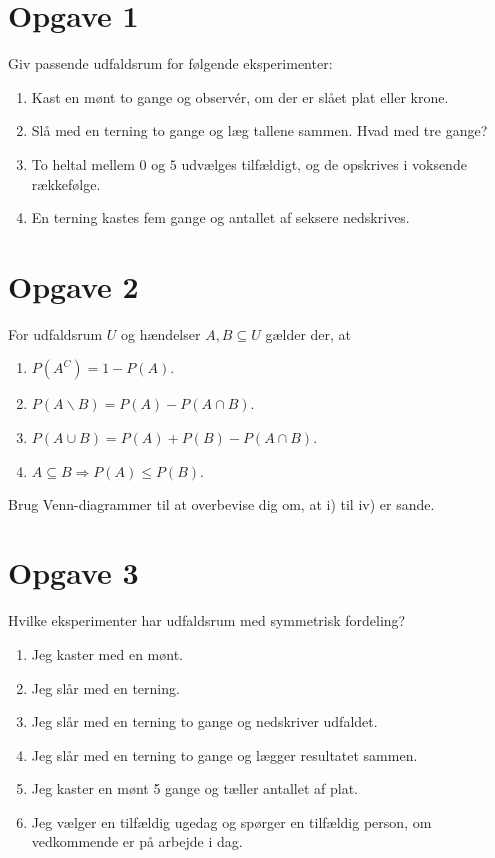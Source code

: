 \section*{Opgave 1}
Giv passende udfaldsrum for følgende eksperimenter:
\begin{enumerate}[label=\roman*)]
\item Kast en mønt to gange og observér, om der er slået plat eller krone. 
\item Slå med en terning to gange og læg tallene sammen. Hvad med tre gange?
\item To heltal mellem $0$ og $5$ udvælges tilfældigt, og de opskrives i voksende rækkefølge.
\item En terning kastes fem gange og antallet af seksere nedskrives.
\end{enumerate}
\section*{Opgave 2}
For udfaldsrum $U$ og hændelser $A,B\subseteq U$ gælder der, at 
\begin{enumerate}[label=\roman*)]
\item $P(A^C) = 1-P(A)$.
\item $P(A \backslash B) = P(A) - P(A\cap B)$.
\item $P(A\cup B) = P(A)+P(B)-P(A\cap B)$.
\item $A\subseteq B \Rightarrow P(A)\leq P(B).$ 
\end{enumerate}
Brug Venn-diagrammer til at overbevise dig om, at i) til iv) er sande.
\section*{Opgave 3}
Hvilke eksperimenter har udfaldsrum med symmetrisk fordeling?
\begin{enumerate}[label=\roman*)]
\item Jeg kaster med en mønt.
\item Jeg slår med en terning.
\item Jeg slår med en terning to gange og nedskriver udfaldet.
\item Jeg slår med en terning to gange og lægger resultatet sammen.
\item Jeg kaster en mønt 5 gange og tæller antallet af plat.
\item Jeg vælger en tilfældig ugedag og spørger en tilfældig person, om vedkommende er på arbejde i dag. 
\end{enumerate}
